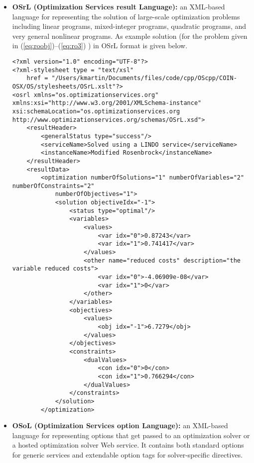 \documentclass[11pt]{article}
\renewcommand{\_}{{\char"5F}}
\renewcommand{\{}{{\char"7B}}
\renewcommand{\}}{{\char"7D}}
\renewcommand{\^}{{\char"0D}}
\renewcommand{\'}{{\char"0D}}
\begin{document}
\begin{itemize}
\item[] {\bf OSrL (Optimization Services result Language):}  an
XML-based language for representing the solution of large-scale
optimization problems including linear programs, mixed-integer programs,
quadratic programs, and very general nonlinear programs.  As example solution (for the problem given in
 (\ref{eq:roobj})--(\ref{eq:ro3}) ) in OSrL format is given below.

\begin{verbatim}
<?xml version="1.0" encoding="UTF-8"?>
<?xml-stylesheet type = "text/xsl"
    href = "/Users/kmartin/Documents/files/code/cpp/OScpp/COIN-OSX/OS/stylesheets/OSrL.xslt"?>
<osrl xmlns="os.optimizationservices.org"
xmlns:xsi="http://www.w3.org/2001/XMLSchema-instance"
xsi:schemaLocation="os.optimizationservices.org
http://www.optimizationservices.org/schemas/OSrL.xsd">
    <resultHeader>
        <generalStatus type="success"/>
        <serviceName>Solved using a LINDO service</serviceName>
        <instanceName>Modified Rosenbrock</instanceName>
    </resultHeader>
    <resultData>
        <optimization numberOfSolutions="1" numberOfVariables="2" numberOfConstraints="2"
            numberOfObjectives="1">
            <solution objectiveIdx="-1">
                <status type="optimal"/>
                <variables>
                    <values>
                        <var idx="0">0.87243</var>
                        <var idx="1">0.741417</var>
                    </values>
                    <other name="reduced costs" description="the variable reduced costs">
                        <var idx="0">-4.06909e-08</var>
                        <var idx="1">0</var>
                    </other>
                </variables>
                <objectives>
                    <values>
                        <obj idx="-1">6.7279</obj>
                    </values>
                </objectives>
                <constraints>
                    <dualValues>
                        <con idx="0">0</con>
                        <con idx="1">0.766294</con>
                    </dualValues>
                </constraints>
            </solution>
        </optimization>

\end{verbatim}




\item[] {\bf OSoL (Optimization Services option Language):}  an
XML-based language for representing options that get passed to an optimization solver or a hosted optimization solver Web service. It contains both standard options for generic services and extendable option tags for solver-specific directives.


\end{itemize}
\end{document}
